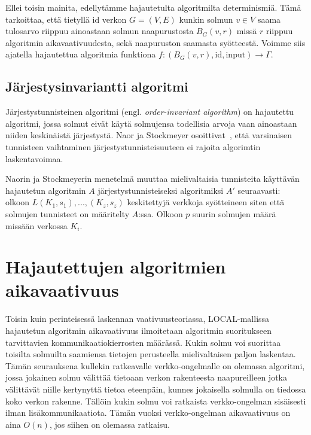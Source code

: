 \documentclass[12pt,finnish]{tktltiki2}
\theoremstyle{definition}
\theoremstyle{remark}
\begin{document}
Ellei toisin mainita, edellytämme hajautetulta algoritmilta determinismiä. Tämä tarkoittaa, että tietyllä $\text{id}$ verkon $G = (V, E)$ kunkin solmun $v \in V$ saama tulosarvo riippuu ainoastaan solmun naapurustosta $B_G(v, r)$ missä $r$ riippuu algoritmin aikavaativuudesta, sekä naapuruston saamasta syötteestä. Voimme siis ajatella hajautettua algoritmia funktiona $f: (B_G(v, r), \text{id}, \text{input}) \rightarrow \Gamma$.


\subsection{Järjestysinvariantti algoritmi}
Järjestystunnisteinen algoritmi (engl. \textit{order-invariant algorithm}) on hajautettu algoritmi, jossa solmut eivät käytä solmujensa todellisia arvoja vaan ainoastaan niiden keskinäistä järjestystä. Naor ja Stockmeyer osoittivat~\cite{naor95}, että varsinaisen tunnisteen vaihtaminen järjestystunnisteisuuteen ei rajoita algorimtin laskentavoimaa.


Naorin ja Stockmeyerin menetelmä muuttaa mielivaltaisia tunnisteita käyttävän hajautetun algoritmin $A$ järjestystunnisteiseksi algoritmiksi $A'$ seuraavasti: olkoon $L(K_1, s_1), ... , (K_z,s_z)$ keskitettyjä verkkoja syötteineen siten että solmujen tunnisteet on määritelty $A$:ssa. Olkoon $p$ suurin solmujen määrä missään verkossa $K_i$.

\section{Hajautettujen algoritmien aikavaativuus}
Toisin kuin perinteisessä laskennan vaativuusteoriassa, LOCAL-mallissa hajautetun algoritmin aikavaativuus ilmoitetaan algoritmin suoritukseen tarvittavien kommunikaatiokierrosten määrässä. Kukin solmu voi suorittaa toisilta solmuilta saamiensa tietojen perusteella mielivaltaisen paljon laskentaa. Tämän seurauksena kullekin ratkeavalle verkko-ongelmalle on olemassa algoritmi, jossa jokainen solmu välittää tietoaan verkon rakenteesta naapureilleen jotka välittävät niille kertynyttä tietoa eteenpäin, kunnes jokaisella solmulla on tiedossa koko verkon rakenne. Tällöin kukin solmu voi ratkaista verkko-ongelman sisäisesti ilman lisäkommunikaatiota. Tämän vuoksi verkko-ongelman aikavaativuus on aina $O(n)$, jos siihen on olemassa ratkaisu.
\end{document}
